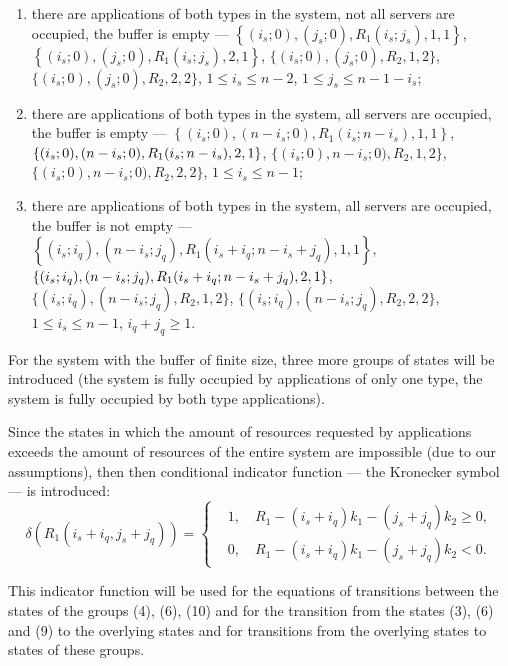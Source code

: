 \documentclass[default]{subfiles}
\begin{document}
{\begin{enumerate}
  $\left\{(0; 0),(n; j_q), R_2,1,2\right\}$,
  $\left\{(0; 0),(n; j_n), R_2,2,2\right\}$, $j_q\geqslant  1$;
\item there are applications of both types in the system, not all
  servers are occupied, the buffer is empty ---
  $\left\{(i_s; 0),(j_s; 0), R_1(i_s;j_s),1,1\right\}$,
  $\left\{(i_s; 0),(j_s; 0), R_1(i_s;j_s),2,1\right\}$,
  $\{(i_s; 0),(j_s; 0), R_2,1,2\}$, $\{(i_s; 0),(j_s; 0), R_2,2,2\}$,
  $1\leqslant  i_s \leqslant  n-2$, $1\leqslant  j_s \leqslant  n-1-i_s$;
\item there are applications of both types in the system, all servers
  are occupied, the buffer is empty ---
  $\left\{(i_s; 0),(n-i_s; 0), R_1(i_s;n-i_s),1,1\right\}$,
  $\{(i_s; 0),(n-i_s; 0), \\* R_1(i_s;n-i_s),2,1\}$,
  $\{(i_s; 0),n-i_s; 0), R_2,1,2\}$,
  $\{(i_s; 0),n-i_s; 0), R_2,2,2\}$, $1\leqslant  i_s \leqslant  n-1$;
\item there are applications of both types in the system, all servers
  are occupied, the buffer is not empty ---
  $\left\{(i_s; i_q),(n-i_s; j_q), R_1(i_s+i_q;n-i_s+
    j_q),1,1\right\}$,
  $\{(i_s; i_q), \\* (n-i_s; j_q), R_1(i_s+i_q; n-i_s+ j_q),2,1\}$,
  $\{(i_s; i_q),(n-i_s; j_q ), R_2,1,2\}$,
  $\{(i_s; i_q),(n-i_s; j_q), R_2,2,2\}$, $1\leqslant  i_s \leqslant  n-1$,
  $i_q+j_q\geqslant  1$.
\end{enumerate}

For the system with the buffer of finite size, three more groups of
states will be introduced (the system is fully occupied by
applications of only one type, the system is fully occupied by both
type applications).

Since the states in which the amount of resources requested by
applications exceeds the amount of resources of the entire system are
impossible (due to our assumptions), then then conditional indicator
function --- the Kronecker symbol --- is introduced:
\begin{equation}
  \delta\left(R_1(i_s+i_q,j_s+j_q)\right)=
  \left\{
    \begin{aligned}
      &1,\quad R_1-(i_s+i_q)k_1-(j_s+j_q)k_2\geqslant  0,\\
      &0, \quad R_1-(i_s+i_q)k_1-(j_s+j_q)k_2 < 0.
    \end{aligned}
  \right.
\end{equation}

This indicator function will be used for the equations of transitions
between the states of the groups (4), (6), (10) and for the transition
from the states (3), (6) and (9) to the overlying states and for
transitions from the overlying states to states of these groups.


}
\end{document}
